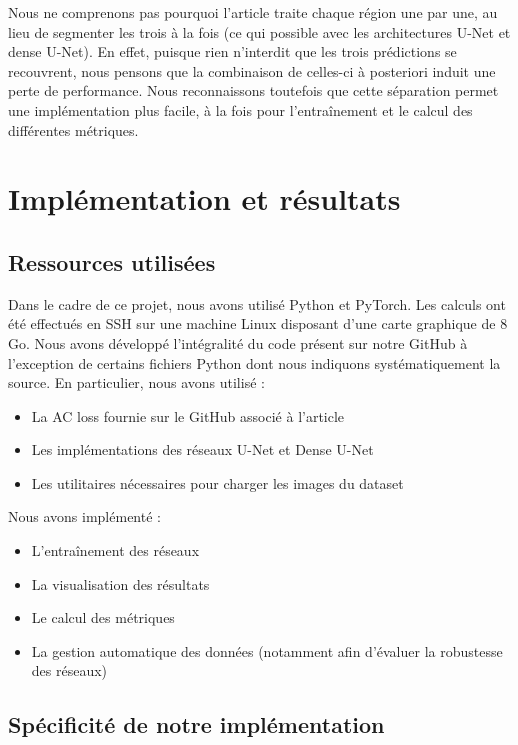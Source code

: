 \documentclass{article}
\begin{document}
Nous ne comprenons pas pourquoi l'article traite chaque région une par une, au lieu de segmenter les trois à la fois (ce qui possible avec les architectures U-Net et dense U-Net). En effet, puisque rien n'interdit que les trois prédictions se recouvrent, nous pensons que la combinaison de celles-ci à posteriori induit une perte de performance. Nous reconnaissons toutefois que cette séparation permet une implémentation plus facile, à la fois pour l'entraînement et le calcul des différentes métriques.

\newpage

\section{Implémentation et résultats}
 
\subsection{Ressources utilisées}

Dans le cadre de ce projet, nous avons utilisé Python et PyTorch. Les calculs ont été effectués en SSH sur une machine Linux  disposant d'une carte graphique de 8 Go. Nous avons développé l'intégralité du code présent sur notre GitHub à l'exception de certains fichiers Python dont nous indiquons systématiquement la source. En particulier, nous avons utilisé :
\begin{itemize}
\item La AC loss fournie sur le GitHub associé à l'article 
\item Les implémentations des réseaux U-Net et Dense U-Net
\item Les utilitaires nécessaires pour charger les images du dataset
\end{itemize}
Nous avons implémenté :
\begin{itemize}
\item L'entraînement des réseaux
\item La visualisation des résultats 
\item Le calcul des métriques
\item La gestion automatique des données (notamment afin d'évaluer la robustesse des réseaux) 
\end{itemize}

\subsection{Spécificité de notre implémentation}
\end{document}
